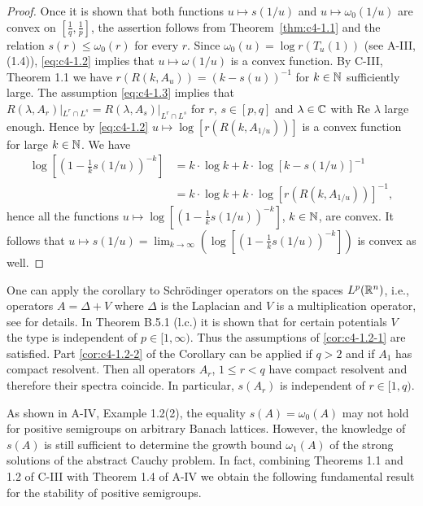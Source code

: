 \begin{proof}
Once it is shown that both functions $u \mapsto s(1/u)$ and $u \mapsto \omega_{0}(1/u)$ are convex on $[\frac{1}{q},\frac{1}{p}]$, the assertion follows from  Theorem~\ref{thm:c4-1.1} and the relation $s(r) \leq \omega_{0}(r)$ for every $r$.
Since $\omega_{0}(u) = \log r(T_{u}(1))$ (see A-III, (1.4)), \eqref{eq:c4-1.2} implies that $u \mapsto \omega(1/u)$ is a convex function.
By C-III, Theorem 1.1 we have $r(R(k,A_{u})) = (k-s(u))^{-1}$ for $k \in \mathbb{N}$ sufficiently large.
The assumption \eqref{eq:c4-1.3} implies that $R(\lambda,A_{r})|_{L^{r} \cap L^{s}} = R(\lambda,A_{s})|_{L^{r} \cap L^{s}}$ for $r$, $s \in [p,q]$ and $\lambda \in \mathbb{C}$ with Re $\lambda$ large enough.
Hence by \eqref{eq:c4-1.2} $u \mapsto \log [r(R(k,A_{1/u}))]$ is a convex function for large $k \in \mathbb{N}$.
We have
\begin{align*}
\log \left[(1 - \frac{1}{k}s(1/u))^{-k}\right] &= k \cdot \log k + k \cdot \log [k - s(1/u)]^{-1} \\
&= k \cdot \log k + k \cdot \log [r(R(k,A_{1/u}))]^{-1},
\end{align*}
hence all the functions $u \mapsto \log[(1 - \frac{1}{k}s(1/u))^{-k}]$, $k \in \mathbb{N}$, are convex.
It follows that $u \mapsto s(1/u) = \lim_{k\to\infty}(\log [(1 - \frac{1}{k}s(1/u))^{-k}])$ is convex as well.
\end{proof}

One can apply the corollary to Schrödinger operators on the spaces $L^{p}(\mathbb{R}^{n})$, i.e., operators $A = \Delta + V$ where $\Delta$ is the Laplacian and $V$ is a multiplication operator, see  \citet{simon:1982} for details.
In Theorem B.5.1 (l.c.) it is shown that for certain potentials $V$ the type is independent of $p \in [1,\infty)$.
Thus the assumptions of \ref{cor:c4-1.2-1} are satisfied.
Part \ref{cor:c4-1.2-2} of the Corollary can be applied if $q > 2$ and if $A_{1}$ has compact resolvent.
Then all operators $A_{r}$, $1 \leq r < q$ have compact resolvent and therefore their spectra coincide.
In particular, $s(A_{r})$ is independent of $r \in [1,q)$.

As shown in A-IV, Example 1.2(2), the equality $s(A) = \omega_{0}(A)$ may not hold for positive semigroups on arbitrary Banach lattices.
However, the knowledge of $s(A)$ is still sufficient to determine the growth bound $\omega_{1}(A)$ of the strong solutions of the abstract Cauchy problem.
In fact, combining Theorems 1.1 and 1.2 of C-III with Theorem 1.4 of A-IV we obtain the following fundamental result for the stability of positive semigroups.

